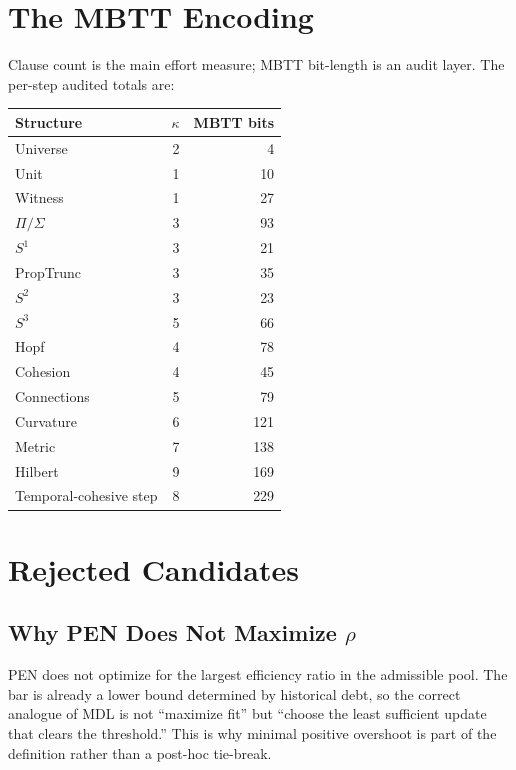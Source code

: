 \documentclass[11pt,a4paper]{article}
\theoremstyle{plain}
\theoremstyle{definition}
\theoremstyle{remark}
\begin{document}
\section{The MBTT Encoding}
\label{app:mbtt}

Clause count is the main effort measure; MBTT bit-length is an audit layer.  The per-step audited totals are:

\begin{center}
\small
\begin{tabular}{@{}lrr@{}}
\toprule
Structure & $\kappa$ & MBTT bits \\
\midrule
Universe & 2 & 4 \\
Unit & 1 & 10 \\
Witness & 1 & 27 \\
$\Pi/\Sigma$ & 3 & 93 \\
$S^1$ & 3 & 21 \\
PropTrunc & 3 & 35 \\
$S^2$ & 3 & 23 \\
$S^3$ & 5 & 66 \\
Hopf & 4 & 78 \\
Cohesion & 4 & 45 \\
Connections & 5 & 79 \\
Curvature & 6 & 121 \\
Metric & 7 & 138 \\
Hilbert & 9 & 169 \\
Temporal-cohesive step & 8 & 229 \\
\bottomrule
\end{tabular}
\end{center}

\section{Rejected Candidates}
\label{app:rejected}

\subsection{Why PEN Does Not Maximize \texorpdfstring{$\rho$}{rho}}

PEN does not optimize for the largest efficiency ratio in the admissible pool.  The bar is already a lower bound determined by historical debt, so the correct analogue of MDL is not ``maximize fit'' but ``choose the least sufficient update that clears the threshold.''  This is why minimal positive overshoot is part of the definition rather than a post-hoc tie-break.
\end{document}

